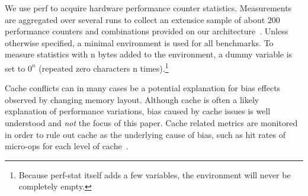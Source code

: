 \documentclass[a4paper,10pt,twocolumn,twoside]{article}
\begin{document}
We use perf to acquire hardware performance counter statistics.
Measurements are aggregated over several runs to collect an extensice sample of about 200 performance counters and combinations provided on our architecture~\cite{Intel:2013:Volume3B}. 
Unless otherwise specified, a minimal environment is used for all benchmarks. 
To measure statistics with n bytes added to the environment, a dummy variable is set to \(0^{n}\) (repeated zero characters n times).\footnote{Because perf-stat itself adds a few variables, the environment will never be completely empty.}

Cache conflicts can in many cases be a potential explanation for bias effects observed by changing memory layout.
Although cache is often a likely explanation of performance variations, bias caused by cache issues is well understood and \emph{not} the focus of this paper.
Cache related metrics are monitored in order to rule out cache as the underlying cause of bias, such as hit rates of micro-ops for each level of cache~\cite{Intel:2012:OptimizationManual}.
\end{document}
